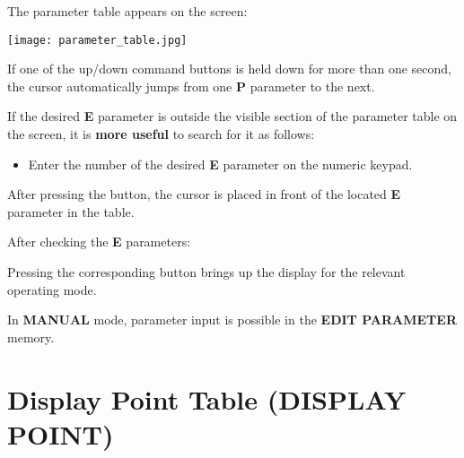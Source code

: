 The parameter table appears on the screen:

\begin{center}
    \texttt{[image: parameter\_table.jpg]}
\end{center}

\begin{itemize}
\end{itemize}

If one of the up/down command buttons is held down for more than one second, the cursor automatically jumps from one \textbf{P} parameter to the next.

If the desired \textbf{E} parameter is outside the visible section of the parameter table on the screen, it is \textbf{more useful} to search for it as follows:

\begin{itemize}
    \item Enter the number of the desired \textbf{E} parameter on the numeric keypad.
\end{itemize}
\vspace{.5cm}
\begin{itemize}
\end{itemize}

After pressing the button, the cursor is placed in front of the located \textbf{E} parameter in the table.

\newpage

After checking the \textbf{E} parameters:

\begin{itemize}
\end{itemize}

Pressing the corresponding button brings up the display for the relevant operating mode.

\notes

In \textbf{MANUAL} mode, parameter input is possible in the \textbf{EDIT PARAMETER} memory.

\section{Display Point Table (DISPLAY POINT)}

